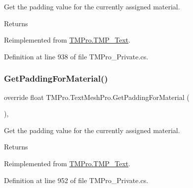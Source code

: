 Get the padding value for the currently assigned material. 

\begin{DoxyReturn}{Returns}

\end{DoxyReturn}


Reimplemented from \mbox{\hyperlink{class_t_m_pro_1_1_t_m_p___text_a1c51fe580e2440116d1de1280b9d189f}{T\+M\+Pro.\+T\+M\+P\+\_\+\+Text}}.



Definition at line 938 of file T\+M\+Pro\+\_\+\+Private.\+cs.

\mbox{\label{class_t_m_pro_1_1_text_mesh_pro_ac5fee6a94cf72cc38078e03bbf662ae4}} 
\subsubsection{\texorpdfstring{GetPaddingForMaterial()}{GetPaddingForMaterial()}\hspace{0.1cm}{\footnotesize\ttfamily [2/2]}}
{\footnotesize\ttfamily override float T\+M\+Pro.\+Text\+Mesh\+Pro.\+Get\+Padding\+For\+Material (\begin{DoxyParamCaption}{ }\end{DoxyParamCaption})\hspace{0.3cm}{\ttfamily [protected]}, {\ttfamily [virtual]}}



Get the padding value for the currently assigned material. 

\begin{DoxyReturn}{Returns}

\end{DoxyReturn}


Reimplemented from \mbox{\hyperlink{class_t_m_pro_1_1_t_m_p___text_a7182ea72ca6b396af6cae05cee59243d}{T\+M\+Pro.\+T\+M\+P\+\_\+\+Text}}.



Definition at line 952 of file T\+M\+Pro\+\_\+\+Private.\+cs.

\mbox{\label{class_t_m_pro_1_1_text_mesh_pro_a08e4fa8600f07af3394efbfdc332ecae}} 
